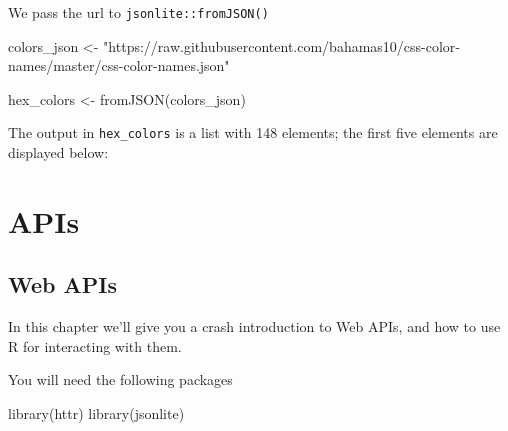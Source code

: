 \documentclass[
]{book}
\newenvironment{Shaded}{\begin{snugshade}}{\end{snugshade}}
\newcommand{\CommentTok}[1]{\textcolor[rgb]{0.56,0.35,0.01}{\textit{#1}}}
\newcommand{\DecValTok}[1]{\textcolor[rgb]{0.00,0.00,0.81}{#1}}
\newcommand{\FunctionTok}[1]{\textcolor[rgb]{0.00,0.00,0.00}{#1}}
\newcommand{\NormalTok}[1]{#1}
\newcommand{\OtherTok}[1]{\textcolor[rgb]{0.56,0.35,0.01}{#1}}
\newcommand{\SpecialCharTok}[1]{\textcolor[rgb]{0.00,0.00,0.00}{#1}}
\newcommand{\StringTok}[1]{\textcolor[rgb]{0.31,0.60,0.02}{#1}}
\begin{document}
We pass the url to \texttt{jsonlite::fromJSON()}

\begin{Shaded}
\begin{Highlighting}[]
\NormalTok{colors\_json }\OtherTok{\textless{}{-}} \StringTok{"https://raw.githubusercontent.com/bahamas10/css{-}color{-}names/master/css{-}color{-}names.json"}

\NormalTok{hex\_colors }\OtherTok{\textless{}{-}} \FunctionTok{fromJSON}\NormalTok{(colors\_json)}
\end{Highlighting}
\end{Shaded}

The output in \texttt{hex\_colors} is a list with 148 elements;
the first five elements are displayed below:

\begin{Shaded}
\end{Shaded}

\hypertarget{part-apis}{%
\part{APIs}\label{part-apis}}

\hypertarget{apis}{%
\chapter{Web APIs}\label{apis}}

In this chapter we'll give you a crash introduction to Web APIs, and how to
use R for interacting with them.

You will need the following packages

\begin{Shaded}
\begin{Highlighting}[]
\FunctionTok{library}\NormalTok{(httr)}
\FunctionTok{library}\NormalTok{(jsonlite)}
\end{Highlighting}
\end{Shaded}
\end{document}
